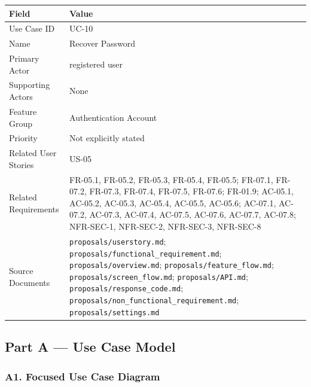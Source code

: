 \documentclass[12pt]{article}
\renewcommand{\baselinestretch}{1.5}
\begin{document}
\begingroup
\small
\renewcommand{\baselinestretch}{1.0}\selectfont
\renewcommand{\arraystretch}{1.15}
\setlength{\tabcolsep}{6pt}
\begin{longtable}{|>{\raggedright\arraybackslash}p{}|>{\raggedright\arraybackslash}p{}|}
\hline
\textbf{Field} & \textbf{Value} \\ \hline
\endhead
Use Case ID & UC-10 \\ \hline
Name & Recover Password \\ \hline
Primary Actor & registered user \\ \hline
Supporting Actors & None \\ \hline
Feature Group & Authentication Account \\ \hline
Priority & Not explicitly stated \\ \hline
Related User Stories & US-05 \\ \hline
Related Requirements & FR-05.1, FR-05.2, FR-05.3, FR-05.4, FR-05.5; FR-07.1, FR-07.2, FR-07.3, FR-07.4, FR-07.5, FR-07.6; FR-01.9; AC-05.1, AC-05.2, AC-05.3, AC-05.4, AC-05.5, AC-05.6; AC-07.1, AC-07.2, AC-07.3, AC-07.4, AC-07.5, AC-07.6, AC-07.7, AC-07.8; NFR-SEC-1, NFR-SEC-2, NFR-SEC-3, NFR-SEC-8 \\ \hline
Source Documents & \texttt{proposals/userstory.md}; \texttt{proposals/functional\_requirement.md}; \texttt{proposals/overview.md}; \texttt{proposals/feature\_flow.md}; \texttt{proposals/screen\_flow.md}; \texttt{proposals/API.md}; \texttt{proposals/response\_code.md}; \texttt{proposals/non\_functional\_requirement.md}; \texttt{proposals/settings.md} \\ \hline
\end{longtable}
\endgroup
\par\medskip

\hypertarget{sec:part-a-use-case-model}{}
\subsection*{Part A --- Use Case Model}
\par\medskip

\hypertarget{sec:a1-focused-use-case-diagram}{}
\subsubsection*{A1. Focused Use Case Diagram}
\par\medskip
\end{document}
